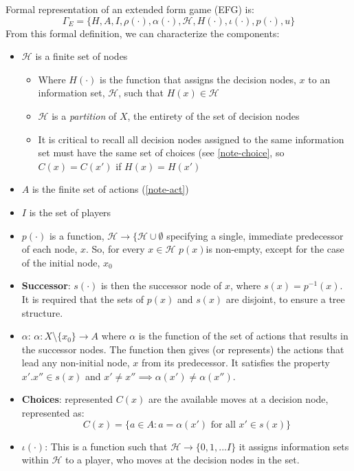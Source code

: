 \documentclass{article}
\begin{document}
\noindent Formal representation of an extended form game (EFG) is: \[
\Gamma_E = \{H, A, I, \rho(\cdot), \alpha(\cdot),\mathcal{H}, H(\cdot), \iota(\cdot), p(\cdot), u \}
\]
\noindent From this formal definition, we can characterize the components: 
\begin{itemize}
    \item $\mathcal{H}$ is a finite set of nodes
        \begin{itemize}
            \item Where $H(\cdot)$ is the function that assigns the decision nodes, $x$ to an information set, $\mathcal{H}$, such that $H(x) \in \mathcal{H}$
            \item $\mathcal{H}$ is a \textit{partition} of $X$, the entirety of the set of decision nodes
            \item It is critical to recall all decision nodes assigned to the same information set must have the same set of choices (see \ref{note-choice}, so $C(x) = C(x')$ if $H(x) = H(x')$
        \end{itemize}
    \item $A$ is the finite set of actions (\ref{note-act})
    \item $I$ is the set of players
    \item $p(\cdot)$ is a function, $\mathcal{H} \rightarrow \{ \mathcal{H } \cup \emptyset$ specifying a single, immediate predecessor of each node, $x$. So, for every $x \in \mathcal{H}$ $p(x)$is non-empty, except for the case of the initial node, $x_0$
    \item \textbf{Successor}: $s(\cdot)$ is then the successor node of $x$, where $s(x) = p^{-1}(x)$. It is required that the sets of $p(x)$ and $s(x)$ are disjoint, to ensure a tree structure. 
    \item \textbf{$\alpha$}: $\alpha: X$\textbackslash$\{x_0\} \rightarrow A$ where $\alpha$ is the function of the set of actions that results in the successor nodes. The function then gives (or represents) the actions that lead any non-initial node, $x$ from its predecessor. It satisfies the property $x'. x'' \in s(x)$ and $x' \neq x'' \implies \alpha(x') \neq \alpha(x'')$.
    \item \textbf{Choices}:\label{note-choice} represented $C(x)$ are the available moves at a decision node, represented as: \[
    C(x) = \big\{a \in A: a = \alpha(x') \text{ for all } x' \in s(x)\}
    \]
    \item \textbf{$\iota(\cdot)$}: This is a function such that $\mathcal{H} \rightarrow \{0,1,... I\}$ it assigns information sets within $\mathcal{H}$ to a player, who moves at the decision nodes in the set. 

\end{itemize}
\end{document}
